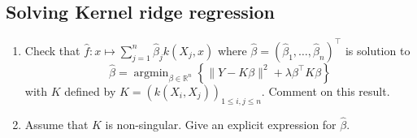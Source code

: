 \documentclass[a4paper,10pt,fleqn]{article}
\newcommand{\R}{\ensuremath{\mathbb{R}}}
\newcommand{\1}{\ensuremath{\mathbbm{1}}}
\newcommand{\argmin}{\mathop{\textrm{argmin}}}
\begin{document}
	\subsection*{Solving Kernel ridge regression}
\begin{enumerate}
	\item Check that $\widehat f:x\mapsto \sum_{j=1}^n\widehat \beta_{j}k(X_{j},x)$ where $\widehat \beta=(\widehat \beta_{1},\ldots,\widehat \beta_{n})^\top$ is solution to
	$$ \widehat \beta=\argmin_{\beta\in\R^n}\left\{\|Y-K\beta\|^2+{\lambda} \beta^\top K\beta\right\}$$
	with $K$ defined by $K=(k(X_{i},X_{j}))_{1\leq i,j\leq n}$. Comment on this result.

%
	\item Assume that $K$ is non-singular. Give an explicit expression for $\widehat \beta$.

%
\end{enumerate}
\end{document}
